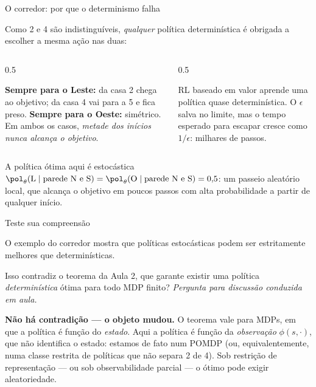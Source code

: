 \documentclass[aspectratio=169, 11pt]{beamer}
\newcommand{\paradiscussao}{\smallskip
  {\footnotesize\color{rlCinza}\itshape Pergunta para discussão conduzida em aula.}}
\newcommand{\thv}{\theta}                       %
\newcommand{\polth}{\pol_{\thv}}                %
\newcommand{\feat}{\phi}                        %
\begin{document}
\begin{frame}{O corredor: por que o determinismo falha}

  Como 2 e 4 são indistinguíveis, \emph{qualquer} política determinística é
  obrigada a escolher a mesma ação nas duas:

  \begin{columns}[T]
  \begin{column}{0.5\textwidth}
    \begin{alertabox}
      \textbf{Sempre para o Leste:} da casa 2 chega ao objetivo; da casa 4 vai
      para a 5 e fica preso. \textbf{Sempre para o Oeste:} simétrico. Em ambos
      os casos, \emph{metade dos inícios nunca alcança o objetivo}.
    \end{alertabox}
  \end{column}
  \begin{column}{0.5\textwidth}
    \begin{ideiabox}
      RL baseado em valor aprende uma política quase determinística. O
      $\epsilon$ salva no limite, mas o tempo esperado para escapar cresce
      como $1/\epsilon$: milhares de passos.
    \end{ideiabox}
  \end{column}
  \end{columns}

  \begin{teobox}{A política ótima aqui é estocástica}
    $\polth(\text{L}\mid \text{parede N e S}) = \polth(\text{O}\mid \text{parede N e S}) = 0{,}5$:
    um passeio aleatório local, que alcança o objetivo em poucos passos com
    alta probabilidade a partir de qualquer início.
  \end{teobox}
\end{frame}

\begin{frame}{Teste sua compreensão}

  \begin{quizbox}{}
    O exemplo do corredor mostra que políticas estocásticas podem ser
    estritamente melhores que determinísticas.

    \smallskip
    Isso contradiz o teorema da Aula 2, que garante existir uma política
    \emph{determinística} ótima para todo MDP finito?
    \paradiscussao
  \end{quizbox}

  \pause

  \begin{respbox}
    \textbf{Não há contradição --- o objeto mudou.} O teorema vale para MDPs,
    em que a política é função do \emph{estado}. Aqui a política é função da
    \emph{observação} $\feat(s,\cdot)$, que não identifica o estado: estamos
    de fato num POMDP (ou, equivalentemente, numa classe restrita de políticas
    que não separa 2 de 4). Sob restrição de representação --- ou sob
    observabilidade parcial --- o ótimo pode exigir aleatoriedade.
  \end{respbox}
\end{frame}
\end{document}
